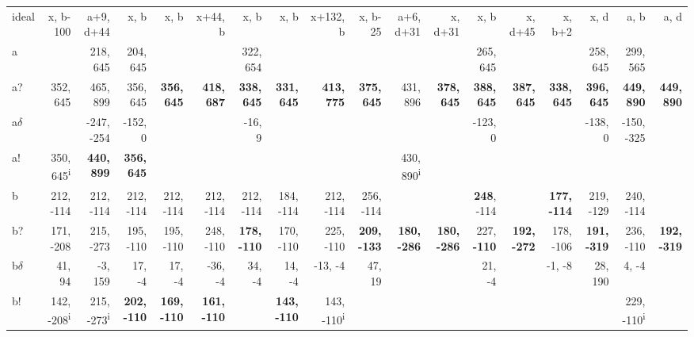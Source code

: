 \begin{table}[p]
{\begin{tabular}{lrrrrrrrrrrrrrrrrr}
ideal & x, b-100 & a+9, d+44 & x, b & x, b & x+44, b & x, b & x, b & x+132, b & x, b-25 & a+6, d+31 & x, d+31 & x, b & x, d+45 & x, b+2 & x, d & a, b & a, d \\
a &  & 218, 645 & 204, 645 &  &  & 322, 654 &  &  &  &  &  & 265, 645 &  &  & 258, 645 & 299, 565 &  \\
a? & 352, 645 & 465, 899 & 356, 645 & \textbf{356, 645} & \textbf{418, 687} & \textbf{338, 645} & \textbf{331, 645} & \textbf{413, 775} & \textbf{375, 645} & 431, 896 & \textbf{378, 645} & \textbf{388, 645} & \textbf{387, 645} & \textbf{338, 645} & \textbf{396, 645} & \textbf{449, 890} & \textbf{449, 890} \\
a$\delta$ &  & -247, -254 & -152, 0 &  &  & -16, 9 &  &  &  &  &  & -123, 0 &  &  & -138, 0 & -150, -325 &  \\
a! & 350, 645\textsuperscript{i} & \textbf{440, 899} & \textbf{356, 645} &  &  &  &  &  &  & 430, 890\textsuperscript{i} &  &  &  &  &  &  &  \\
b & 212, -114 & 212, -114 & 212, -114 & 212, -114 & 212, -114 & 212, -114 & 184, -114 & 212, -114 & 256, -114 &  &  & \textbf{248}, -114 &  & \textbf{177, -114} & 219, -129 & 240, -114 &  \\
b? & 171, -208 & 215, -273 & 195, -110 & 195, -110 & 248, -110 & \textbf{178, -110} & 170, -110 & 225, -110 & \textbf{209, -133} & \textbf{180, -286} & \textbf{180, -286} & 227, \textbf{-110} & \textbf{192, -272} & 178, -106 & \textbf{191, -319} & 236, -110 & \textbf{192, -319} \\
b$\delta$ & 41, 94 & -3, 159 & 17, -4 & 17, -4 & -36, -4 & 34, -4 & 14, -4 & -13, -4 & 47, 19 &  &  & 21, -4 &  & -1, -8 & 28, 190 & 4, -4 &  \\
b! & 142, -208\textsuperscript{i} & 215, -273\textsuperscript{i} & \textbf{202, -110} & \textbf{169, -110} & \textbf{161, -110} &  & \textbf{143, -110} & 143, -110\textsuperscript{i} &  &  &  &  &  &  &  & 229, -110\textsuperscript{i} &  \\

\end{tabular}}
\end{table}
